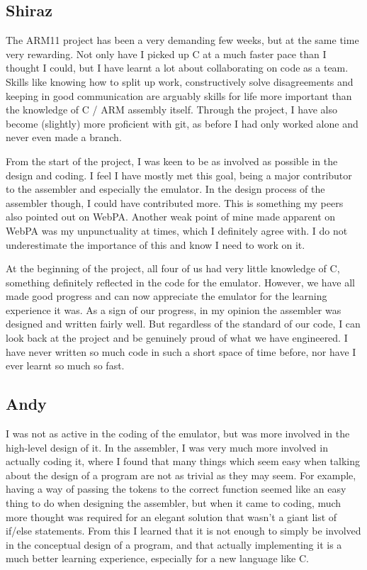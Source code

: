 \documentclass[a4paper]{article}
\begin{document}
\subsection{Shiraz}
The ARM11 project has been a very demanding few weeks, but at the same time very rewarding. Not only have I picked up C at a much faster pace than I thought I could, but I have learnt a lot about collaborating on code as a team. Skills like knowing how to split up work, constructively solve disagreements and keeping in good communication are arguably skills for life more important than the knowledge of C / ARM assembly itself. Through the project, I have also become (slightly) more proficient with git, as before I had only worked alone and never even made a branch. 

From the start of the project, I was keen to be as involved as possible in the design and coding. I feel I have mostly met this goal, being a major contributor to the assembler and especially the emulator. In the design process of the assembler though, I could have contributed more. This is something my peers also pointed out on WebPA. Another weak point of mine made apparent on WebPA was my unpunctuality at times, which I definitely agree with. I do not underestimate the importance of this and know I need to work on it.

At the beginning of the project, all four of us had very little knowledge of C, something definitely reflected in the code for the emulator. However, we have all made good progress and can now appreciate the emulator for the learning experience it was. As a sign of our progress, in my opinion the assembler was designed and written fairly well. But regardless of the standard of our code, I can look back at the project and be genuinely proud of what we have engineered. I have never written so much code in such a short space of time before, nor have I ever learnt so much so fast.

\subsection{Andy}

I was not as active in the coding of the emulator, but was more involved in the high-level design of it. In the assembler, I was very much more involved in actually coding it, where I found that many things which seem easy when talking about the design of a program are not as trivial as they may seem. For example, having a way of passing the tokens to the correct function seemed like an easy thing to do when designing the assembler, but when it came to coding, much more thought was required for an elegant solution that wasn’t a giant list of if/else statements. From this I learned that it is not enough to simply be involved in the conceptual design of a program, and that actually implementing it is a much better learning experience, especially for a new language like C.
\end{document}
